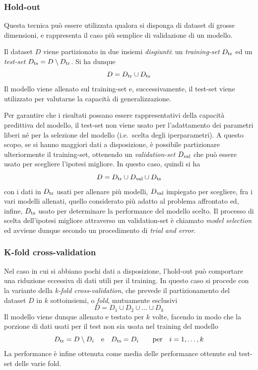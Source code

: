 \subsubsection*{Hold-out}
Questa tecnica può essere utilizzata qualora si disponga di dataset di grosse dimensioni, e rappresenta il caso più semplice di validazione di un modello.

Il dataset $D$ viene partizionato in due insiemi \emph{disgiunti}: un \emph{training-set} $D_\textup{tr}$ ed un \emph{test-set} $D_\textup{ts} = D \setminus D_\textup{tr}$. Si ha dunque
\[
D = D_\textup{tr} \cup D_\textup{ts} 
\]
Il modello viene allenato sul training-set e, successivamente, il test-set viene utilizzato per valutarne la capacità di generalizzazione. 

Per garantire che i risultati possano essere rappresentativi della capacità predittiva del modello, il test-set non viene usato per l'adattamento dei parametri liberi né per la selezione del modello (i.e.\ scelta degli iperparametri). A questo scopo, se si hanno maggiori dati a disposizione, è possibile partizionare ulteriormente il training-set, ottenendo un \emph{validation-set} $D_\textup{val}$ che può essere usato per scegliere l'ipotesi migliore. In questo caso, quindi si ha
\[
D = D_\textup{tr} \cup D_\textup{val} \cup D_\textup{ts} 
\]
con i dati in $D_\textup{tr}$ usati per allenare più modelli, $D_\textup{val}$ impiegato per scegliere, fra i vari modelli allenati, quello considerato più adatto al problema affrontato ed, infine, $D_\textup{ts}$ usato per determinare la performance del modello scelto. Il processo di scelta dell'ipotesi migliore attraverso un validation-set è chiamato \emph{model selection} ed avviene dunque secondo un procedimento di \emph{trial and error}.

\subsubsection*{K-fold cross-validation}
Nel caso in cui si abbiano pochi dati a disposizione, l'hold-out può comportare una riduzione eccessiva di dati utili per il training. In questo caso si procede con la variante della \emph{k-fold cross-validation}, che prevede il partizionamento del dataset $D$ in $k$ sottoinsiemi, o \emph{fold}, mutuamente esclusivi
\[
D = D_1 \cup D_2 \cup \dots \cup D_k
\]
Il modello viene dunque allenato e testato per $k$ volte, facendo in modo che la porzione di dati usati per il test non sia usata nel training del modello
\[
D_\textup{tr} = D \setminus D_i
\quad \text{e} \quad 
D_\textup{ts} = D_i
\qquad \text{per} \quad i=1,\dots,k
\]
La performance è infine ottenuta come media delle performance ottenute sul test-set delle varie fold.

